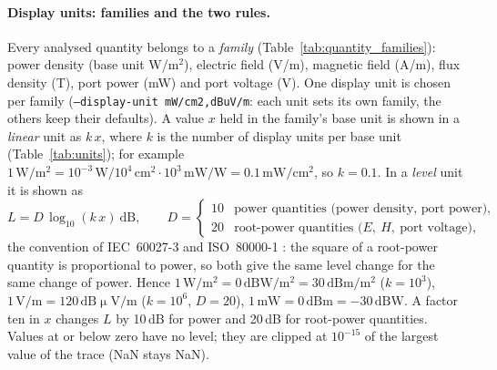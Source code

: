 \documentclass[10pt,letterpaper]{article}
\numberwithin{equation}{section}
\begin{document}
\paragraph{Display units: families and the two rules.}
Every analysed quantity belongs to a \emph{family} (Table~\ref{tab:quantity_families}):
power density (base unit W/m$^2$), electric field (V/m), magnetic field (A/m),
flux density (T), port power (mW) and port voltage (\textmu V). One display unit is
chosen per family (\texttt{--display-unit mW/cm2,dBuV/m}: each unit sets its own
family, the others keep their defaults). A value $x$ held in the family's base
unit is shown in a \emph{linear} unit as $k\,x$, where $k$ is the number of display
units per base unit (Table~\ref{tab:units}); for example
$1\,\mathrm{W/m^2} = 10^{-3}\,\mathrm{W}/10^{4}\,\mathrm{cm^2}\cdot 10^{3}\,\mathrm{mW/W}
= 0.1\,\mathrm{mW/cm^2}$, so $k = 0.1$. In a \emph{level} unit it is shown as
\begin{equation}
L = D\,\log_{10}(k\,x)\ \mathrm{dB},\qquad
D = \begin{cases}10 & \text{power quantities (power density, port power)},\\
20 & \text{root-power quantities (}E,\ H,\ \text{port voltage)},\end{cases}
\label{eq:level}
\end{equation}
the convention of IEC~60027-3 and ISO~80000-1 \cite{B41,B42}: the square of a
root-power quantity is proportional to power, so both give the same level
change for the same change of power. Hence $1\,\mathrm{W/m^2} = 0\,\mathrm{dBW/m^2}
= 30\,\mathrm{dBm/m^2}$ ($k = 10^3$), $1\,\mathrm{V/m} = 120\,\mathrm{dB\upmu V/m}$
($k=10^6$, $D=20$), $1\,\mathrm{mW} = 0\,\mathrm{dBm} = -30\,\mathrm{dBW}$. A
factor ten in $x$ changes $L$ by 10\,dB for power and 20\,dB for root-power
quantities. Values at or below zero have no level; they are clipped at
$10^{-15}$ of the largest value of the trace (NaN stays NaN).
\end{document}
